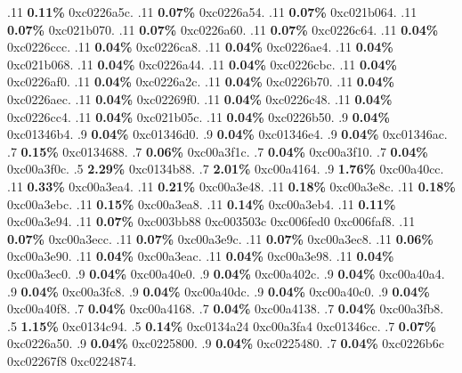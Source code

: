 \begin{profile}
{.11 \textbf{0.11\%} 0xc0226a5c. 
.11 \textbf{0.07\%} 0xc0226a54. 
.11 \textbf{0.07\%} 0xc021b064. 
.11 \textbf{0.07\%} 0xc021b070. 
.11 \textbf{0.07\%} 0xc0226a60. 
.11 \textbf{0.07\%} 0xc0226c64. 
.11 \textbf{0.04\%} 0xc0226ccc. 
.11 \textbf{0.04\%} 0xc0226ca8. 
.11 \textbf{0.04\%} 0xc0226ae4. 
.11 \textbf{0.04\%} 0xc021b068. 
.11 \textbf{0.04\%} 0xc0226a44. 
.11 \textbf{0.04\%} 0xc0226cbc. 
.11 \textbf{0.04\%} 0xc0226af0. 
.11 \textbf{0.04\%} 0xc0226a2c. 
.11 \textbf{0.04\%} 0xc0226b70. 
.11 \textbf{0.04\%} 0xc0226aec. 
.11 \textbf{0.04\%} 0xc02269f0. 
.11 \textbf{0.04\%} 0xc0226c48. 
.11 \textbf{0.04\%} 0xc0226cc4. 
.11 \textbf{0.04\%} 0xc021b05c. 
.11 \textbf{0.04\%} 0xc0226b50. 
.9 \textbf{0.04\%} 0xc01346b4. 
.9 \textbf{0.04\%} 0xc01346d0. 
.9 \textbf{0.04\%} 0xc01346e4. 
.9 \textbf{0.04\%} 0xc01346ac. 
.7 \textbf{0.15\%} 0xc0134688. 
.7 \textbf{0.06\%} 0xc00a3f1c. 
.7 \textbf{0.04\%} 0xc00a3f10. 
.7 \textbf{0.04\%} 0xc00a3f0c. 
.5 \textbf{2.29\%} 0xc0134b88. 
.7 \textbf{2.01\%} 0xc00a4164. 
.9 \textbf{1.76\%} 0xc00a40cc. 
.11 \textbf{0.33\%} 0xc00a3ea4. 
.11 \textbf{0.21\%} 0xc00a3e48. 
.11 \textbf{0.18\%} 0xc00a3e8c. 
.11 \textbf{0.18\%} 0xc00a3ebc. 
.11 \textbf{0.15\%} 0xc00a3ea8. 
.11 \textbf{0.14\%} 0xc00a3eb4. 
.11 \textbf{0.11\%} 0xc00a3e94. 
.11 \textbf{0.07\%} 0xc003bb88\newline {} 0xc003503c\newline {} 0xc006fed0\newline {} 0xc006faf8. 
.11 \textbf{0.07\%} 0xc00a3ecc. 
.11 \textbf{0.07\%} 0xc00a3e9c. 
.11 \textbf{0.07\%} 0xc00a3ec8. 
.11 \textbf{0.06\%} 0xc00a3e90. 
.11 \textbf{0.04\%} 0xc00a3eac. 
.11 \textbf{0.04\%} 0xc00a3e98. 
.11 \textbf{0.04\%} 0xc00a3ec0. 
.9 \textbf{0.04\%} 0xc00a40e0. 
.9 \textbf{0.04\%} 0xc00a402c. 
.9 \textbf{0.04\%} 0xc00a40a4. 
.9 \textbf{0.04\%} 0xc00a3fc8. 
.9 \textbf{0.04\%} 0xc00a40dc. 
.9 \textbf{0.04\%} 0xc00a40c0. 
.9 \textbf{0.04\%} 0xc00a40f8. 
.7 \textbf{0.04\%} 0xc00a4168. 
.7 \textbf{0.04\%} 0xc00a4138. 
.7 \textbf{0.04\%} 0xc00a3fb8. 
.5 \textbf{1.15\%} 0xc0134c94. 
.5 \textbf{0.14\%} 0xc0134a24\newline {} 0xc00a3fa4\newline {} 0xc01346cc. 
.7 \textbf{0.07\%} 0xc0226a50. 
.9 \textbf{0.04\%} 0xc0225800. 
.9 \textbf{0.04\%} 0xc0225480. 
.7 \textbf{0.04\%} 0xc0226b6c\newline {} 0xc02267f8\newline {} 0xc0224874. 
}
\end{profile}
